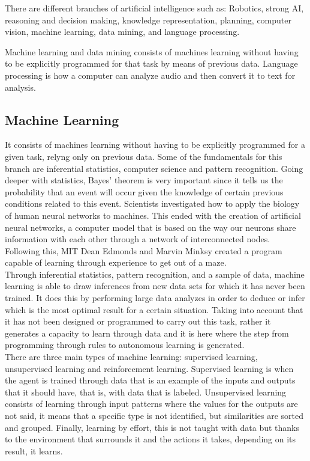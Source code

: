 \documentclass[sigconf,12pt,review=false,natbib=false]{acmart}
\begin{document}
There are different branches of artificial intelligence such as: Robotics, strong AI, reasoning and decision
making, knowledge representation, planning, computer vision, machine learning, data mining, and language processing.

Machine learning and data mining consists of machines learning without having to be explicitly programmed for
that task by means of previous data. Language processing is how a computer can analyze audio and then convert it
to text for analysis. 


\subsection{Machine Learning}

It consists of machines learning without having to be explicitly programmed for a given task, relyng only on
previous data.
Some of the fundamentals for this branch are inferential statistics, computer science and pattern recognition.
Going deeper with statistics, Bayes' theorem is very important since it tells us the probability that an event will
occur given the knowledge of certain previous conditions related to this event.
Scientists investigated how to apply the biology of human neural networks to machines. This ended with the creation
of artificial neural networks, a computer model that is based on the way our neurons share information with each other
through a network of interconnected nodes. Following this, MIT Dean Edmonds and Marvin Minksy created a program
capable of learning through experience to get out of a maze. \\

Through inferential statistics, pattern recognition, and a sample of data, machine learning is able to draw inferences
from new data sets for which it has never been trained. It does this by performing large data analyzes in order to
deduce or infer which is the most optimal result for a certain situation. Taking into account that it has not been
designed or programmed to carry out this task, rather it generates a capacity to learn through data and it is here
where the step from programming through rules to autonomous learning is generated. \\

There are three main types of machine learning: supervised learning, unsupervised learning and reinforcement learning.
Supervised learning is when the agent is trained through data that is an example of the inputs and outputs that it
should have, that is, with data that is labeled. 
Unsupervised learning consists of learning through input patterns where the values for the outputs are not said,
it means that a specific type is not identified, but similarities are sorted and grouped. 
Finally, learning by effort, this is not taught with data but thanks to the environment that surrounds it and the
actions it takes, depending on its result, it learns.
\end{document}
